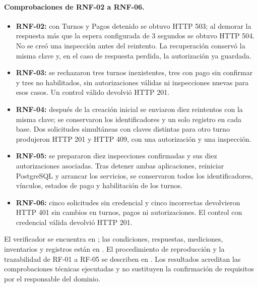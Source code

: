 \documentclass[11pt,a4paper]{article}
\begin{document}
	\paragraph{Comprobaciones de RNF-02 a RNF-06.}
	\begin{itemize}[leftmargin=*]
		\item \textbf{RNF-02:} con Turnos y Pagos detenido se obtuvo HTTP 503; al demorar la respuesta más que la espera configurada de 3 segundos se obtuvo HTTP 504. No se creó una inspección antes del reintento. La recuperación conservó la misma clave y, en el caso de respuesta perdida, la autorización ya guardada.
		\item \textbf{RNF-03:} se rechazaron tres turnos inexistentes, tres con pago sin confirmar y tres no habilitados, sin autorizaciones válidas ni inspecciones nuevas para esos casos. Un control válido devolvió HTTP 201.
		\item \textbf{RNF-04:} después de la creación inicial se enviaron diez reintentos con la misma clave; se conservaron los identificadores y un solo registro en cada base. Dos solicitudes simultáneas con claves distintas para otro turno produjeron HTTP 201 y HTTP 409, con una autorización y una inspección.
		\item \textbf{RNF-05:} se prepararon diez inspecciones confirmadas y sus diez autorizaciones asociadas. Tras detener ambas aplicaciones, reiniciar PostgreSQL y arrancar los servicios, se conservaron todos los identificadores, vínculos, estados de pago y habilitación de los turnos.
		\item \textbf{RNF-06:} cinco solicitudes sin credencial y cinco incorrectas devolvieron HTTP 401 sin cambios en turnos, pagos ni autorizaciones. El control con credencial válida devolvió HTTP 201.
	\end{itemize}
	{\raggedright El verificador se encuentra en ; las condiciones, respuestas, mediciones, inventarios y registros están en . El procedimiento de reproducción y la trazabilidad de RF-01 a RF-05 se describen en . Los resultados acreditan las comprobaciones técnicas ejecutadas y no sustituyen la confirmación de requisitos por el responsable del dominio.\par}
	

\end{document}
